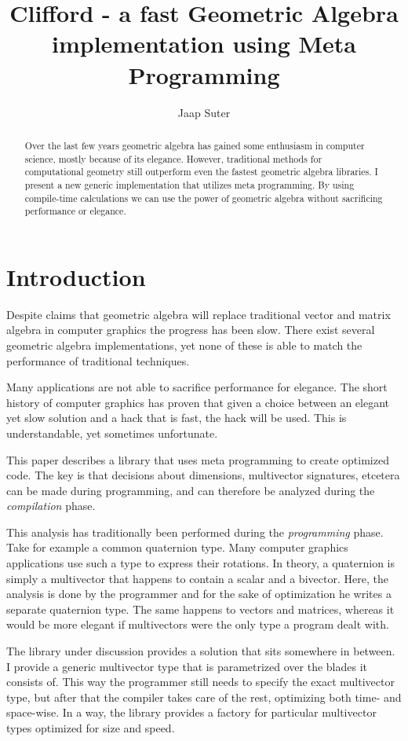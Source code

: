 \documentclass[10pt]{article}
\author{Jaap Suter}
\title{Clifford - a fast Geometric Algebra implementation using Meta Programming}
\begin{document}
\maketitle

\begin{abstract}
Over the last few years geometric algebra has gained some enthusiasm in computer science, mostly because of its elegance. However, traditional methods for computational geometry still outperform even the fastest geometric algebra libraries. I present a new generic implementation that utilizes meta programming. By using compile-time calculations we can use the power of geometric algebra without sacrificing performance or elegance.
\end{abstract}

\section{Introduction}

Despite claims that geometric algebra will replace traditional vector and matrix algebra in computer graphics the progress has been slow. There exist several geometric algebra implementations, yet none of these is able to match the performance of traditional techniques.

Many applications are not able to sacrifice performance for elegance. The short history of computer graphics has proven that given a choice between an elegant yet slow solution and a hack that is fast, the hack will be used. This is understandable, yet sometimes unfortunate.

This paper describes a library that uses meta programming to create optimized code. The key is that decisions about dimensions, multivector signatures, etcetera can be made during programming, and can therefore be analyzed during the \emph{compilation} phase.

This analysis has traditionally been performed during the \emph{programming} phase. Take for example a common quaternion type. Many computer graphics applications use such a type to express their rotations. In theory, a quaternion is simply a multivector that happens to contain a scalar and a bivector. Here, the analysis is done by the programmer and for the sake of optimization he writes a separate quaternion type. The same happens to vectors and matrices, whereas it would be more elegant if multivectors were the only type a program dealt with.

The library under discussion provides a solution that sits somewhere in between. I provide a generic multivector type that is parametrized over the blades it consists of. This way the programmer still needs to specify the exact multivector type, but after that the compiler takes care of the rest, optimizing both time- and space-wise. In a way, the library provides a factory for particular multivector types optimized for size and speed.
\end{document}
